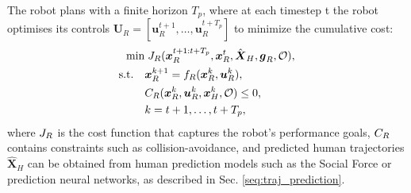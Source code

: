 The robot plans with a finite horizon $T_{p}$, where at each timestep t the robot optimises its controls $\boldsymbol{U}_{R} = [\boldsymbol{u}_{R}^{t+1}, \dots, \boldsymbol{u}_{R}^{t+T_{p}}]$ to minimize the cumulative cost:
\begin{equation}
\label{eq:robot_planning}
\begin{aligned}
    \min &\; J_{R}(\boldsymbol{x}_{R}^{t+1:t+T_{p}}, \boldsymbol{x}_{R}^{t}, \hat{\boldsymbol{X}}_{H}, \boldsymbol{g}_{R}, \mathcal{O}), \\
    \text{s.t.} \quad &\boldsymbol{x}_{R}^{k+1} = f_{R}(\boldsymbol{x}_{R}^{k}, \boldsymbol{u}_{R}^{k}), \\
                      &C_{R}(\boldsymbol{x}_{R}^{k}, \boldsymbol{u}_{R}^{k}, \boldsymbol{x}_{H}^{k}, \mathcal{O}) \leq 0, \\
                      &k = t+1, \dots, t+T_{p},
\end{aligned}
\end{equation}
where $J_{R}$ is the cost function that captures the robot's performance goals, 
$C_{R}$ contains constraints such as collision-avoidance, 
and predicted human trajectories $\hat{\boldsymbol{X}}_{H}$ can be obtained from human prediction models such as the Social Force or prediction neural networks, as described in Sec. \ref{seq:traj_prediction}.


